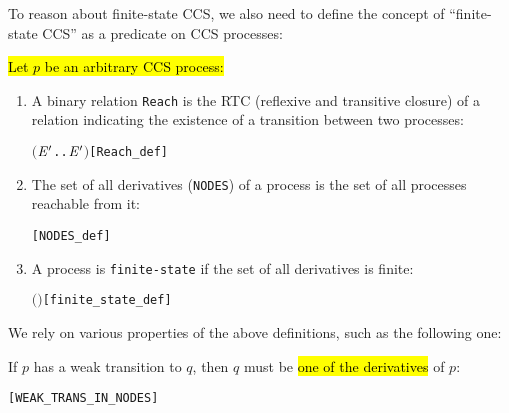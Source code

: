 To reason about finite-state CCS, we also need to define the concept
of ``finite-state CCS'' as a predicate on CCS processes:
\begin{definition}
  \hl{Let $p$ be an arbitrary CCS process:}
\begin{enumerate}
\item A binary relation \texttt{Reach} is the RTC (reflexive and transitive
  closure) of a relation indicating the existence of a transition between two processes:
\begin{alltt}
 \HOLTokenDefEquality{} \ensuremath{(}\HOLTokenLambda{} \ensuremath{\HOLBoundVar{E}\sp{\prime}}. \HOLSymConst{\HOLTokenExists{}}.  \HOLTokenTransBegin{}\HOLTokenTransEnd \ensuremath{\HOLBoundVar{E}\sp{\prime}}\ensuremath{)}\HOLSymConst{\HOLTokenSupStar{}}\hfill[Reach_def]
\end{alltt}
\item The set of all derivatives (\texttt{NODES}) of a process is the
  set of all processes reachable from it:
\begin{alltt}
  \HOLTokenDefEquality{} \HOLTokenLeftbrace{} \HOLTokenBar{}   \HOLTokenRightbrace{}\hfill[NODES_def]
\end{alltt}
\item A process is \texttt{finite-state} if the set of all derivatives is finite:
\begin{alltt}
  \HOLTokenDefEquality{}  \ensuremath{(} \ensuremath{)}\hfill[finite_state_def]
\end{alltt}
\end{enumerate}
\end{definition}
We rely on various 
 properties of the above definitions, such as the following one:
\begin{proposition}
If $p$ has a weak transition to $q$, then $q$ must be \hl{one of the derivatives} of $p$:
\begin{alltt}
\HOLTokenTurnstile{}  \HOLTokenWeakTransBegin{}\HOLTokenWeakTransEnd {} \HOLSymConst{\HOLTokenImp{}}  \HOLSymConst{\HOLTokenIn{}}  \hfill[WEAK_TRANS_IN_NODES]
\end{alltt}
\end{proposition}

